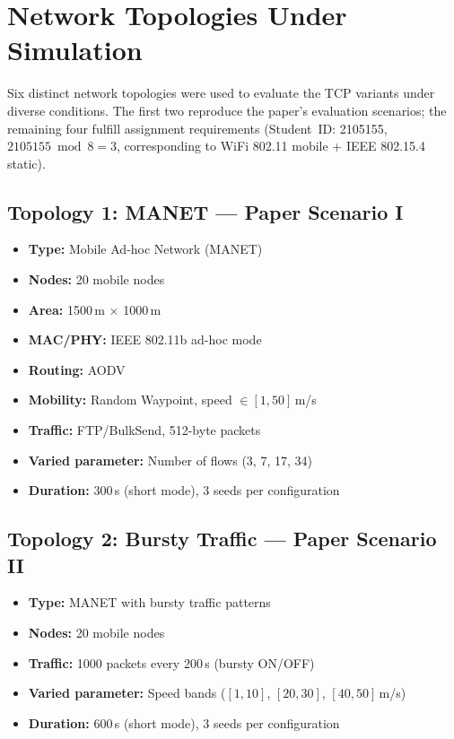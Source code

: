 \documentclass[12pt,a4paper]{article}
\begin{document}
\section{Network Topologies Under Simulation}
\label{sec:topologies}

Six distinct network topologies were used to evaluate the TCP variants under diverse conditions. The first two reproduce the paper's evaluation scenarios; the remaining four fulfill assignment requirements (Student~ID: 2105155, $2105155 \bmod 8 = 3$, corresponding to WiFi 802.11 mobile + IEEE 802.15.4 static).

\subsection{Topology 1: MANET --- Paper Scenario I}
\label{sec:topo_manet}
\begin{itemize}[nosep]
    \item \textbf{Type:} Mobile Ad-hoc Network (MANET)
    \item \textbf{Nodes:} 20 mobile nodes
    \item \textbf{Area:} 1500\,m $\times$ 1000\,m
    \item \textbf{MAC/PHY:} IEEE 802.11b ad-hoc mode
    \item \textbf{Routing:} AODV
    \item \textbf{Mobility:} Random Waypoint, speed $\in [1, 50]$\,m/s
    \item \textbf{Traffic:} FTP/BulkSend, 512-byte packets
    \item \textbf{Varied parameter:} Number of flows (3, 7, 17, 34)
    \item \textbf{Duration:} 300\,s (short mode), 3 seeds per configuration
\end{itemize}

\subsection{Topology 2: Bursty Traffic --- Paper Scenario II}
\label{sec:topo_bursty}
\begin{itemize}[nosep]
    \item \textbf{Type:} MANET with bursty traffic patterns
    \item \textbf{Nodes:} 20 mobile nodes
    \item \textbf{Traffic:} 1000 packets every 200\,s (bursty ON/OFF)
    \item \textbf{Varied parameter:} Speed bands ($[1,10]$, $[20,30]$, $[40,50]$\,m/s)
    \item \textbf{Duration:} 600\,s (short mode), 3 seeds per configuration
\end{itemize}
\end{document}
